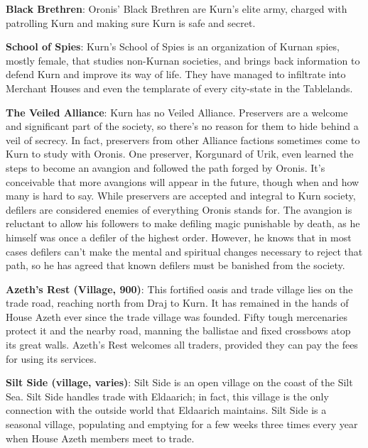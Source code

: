 {
	\textbf{Black Brethren}: Oronis' Black Brethren are Kurn's elite army, charged with patrolling Kurn and making sure Kurn is safe and secret.

	\textbf{School of Spies}: Kurn's School of Spies is an organization of Kurnan spies, mostly female, that studies non-Kurnan societies, and brings back information to defend Kurn and improve its way of life. They have managed to infiltrate into Merchant Houses and even the templarate of every city-state in the Tablelands.

	\textbf{The Veiled Alliance}: Kurn has no Veiled Alliance. Preservers are a welcome and significant part of the society, so there's no reason for them to hide behind a veil of secrecy. In fact, preservers from other Alliance factions sometimes come to Kurn to study with Oronis. One preserver, Korgunard of Urik, even learned the steps to become an avangion and followed the path forged by Oronis. It's conceivable that more avangions will appear in the future, though when and how many is hard to say. While preservers are accepted and integral to Kurn society, defilers are considered enemies of everything Oronis stands for. The avangion is reluctant to allow his followers to make defiling magic punishable by death, as he himself was once a defiler of the highest order. However, he knows that in most cases defilers can't make the mental and spiritual changes necessary to reject that path, so he has agreed that known defilers must be banished from the society.
}
{
	\textbf{Azeth's Rest (Village, 900)}: This fortified oasis and trade village lies on the trade road, reaching north from Draj to Kurn. It has remained in the hands of House Azeth ever since the trade village was founded. Fifty tough mercenaries protect it and the nearby road, manning the ballistae and fixed crossbows atop its great walls. Azeth's Rest welcomes all traders, provided they can pay the fees for using its services.

	\textbf{Silt Side (village, varies)}: Silt Side is an open village on the coast of the Silt Sea. Silt Side handles trade with Eldaarich; in fact, this village is the only connection with the outside world that Eldaarich maintains. Silt Side is a seasonal village, populating and emptying for a few weeks three times every year when House Azeth members meet to trade.
}
{}
